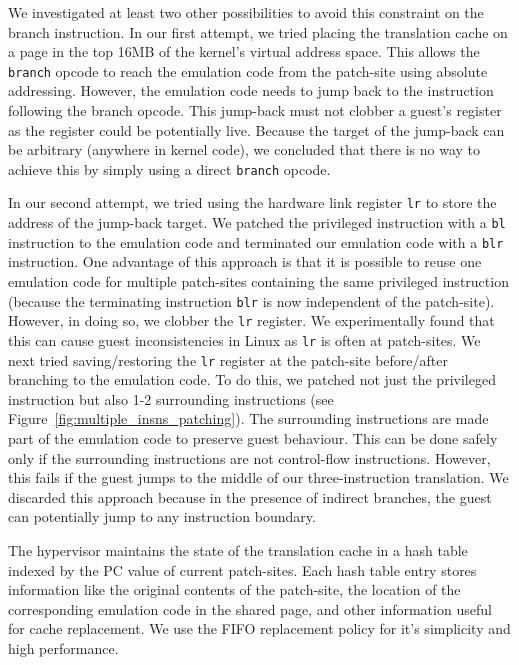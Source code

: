 \documentclass[10pt,twocolumn]{article}
\begin{document}
We investigated at least two other possibilities to avoid this constraint
on the branch instruction. In our first attempt, we tried placing the
translation cache on a page in the top 16MB of the kernel's virtual address
space. This allows the {\tt branch} opcode to reach the emulation code from
the patch-site using absolute addressing. However, the emulation code needs to
jump back to the instruction following the branch opcode. This jump-back must not
clobber a guest's register as the register could be potentially live. Because
the target of the jump-back can be arbitrary (anywhere in kernel code), we concluded
that there is no way to achieve this by simply using a direct {\tt branch} opcode.

In our second attempt, we tried using the hardware link register {\tt lr} to store
the address
of the jump-back target. We patched the privileged instruction with a {\tt bl}
instruction to the emulation code and terminated our emulation code with a {\tt blr}
instruction. One advantage of this approach is that it is possible to
reuse one emulation code
for multiple patch-sites containing the same privileged instruction (because the
terminating instruction {\tt blr} is now independent of the patch-site). However, in
doing so, we
clobber the {\tt lr} register. We experimentally found that this can cause
guest inconsistencies in Linux as {\tt lr} is often at patch-sites.
We next tried saving/restoring the
{\tt lr} register at the patch-site before/after branching to the emulation code.
To do this, we patched not just the privileged instruction but also 1-2
surrounding instructions (see Figure~\ref{fig:multiple_insns_patching}). The
surrounding instructions are made part of the emulation code to preserve
guest behaviour. This can
be done safely only if the surrounding instructions are not control-flow instructions.
However, this fails if the guest jumps to the middle of our
three-instruction translation. We discarded this approach because in the presence
of indirect branches, the guest can potentially jump to any instruction boundary.

The hypervisor maintains the state of the translation cache in
a hash table indexed by the PC value of current patch-sites. Each hash table
entry stores information like the original contents of the patch-site,
the location of the corresponding emulation code in the shared page, and other
information useful
for cache replacement. We use the FIFO replacement policy for it's simplicity
and high performance.
\end{document}
